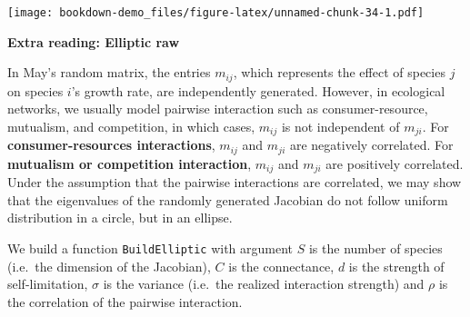 \documentclass[
]{book}
\begin{document}
\texttt{[image: bookdown-demo\_files/figure-latex/unnamed-chunk-34-1.pdf]}

\textbf{Extra reading: Elliptic raw}

In May's random matrix, the entries \(m_{ij}\), which represents the effect of species \(j\) on species \(i\)'s growth rate, are independently generated. However, in ecological networks, we usually model pairwise interaction such as consumer-resource, mutualism, and competition, in which cases, \(m_{ij}\) is not independent of \(m_{ji}\). For \textbf{consumer-resources interactions}, \(m_{ij}\) and \(m_{ji}\) are negatively correlated. For \textbf{mutualism or competition interaction}, \(m_{ij}\) and \(m_{ji}\) are positively correlated. Under the assumption that the pairwise interactions are correlated, we may show that the eigenvalues of the randomly generated Jacobian do not follow uniform distribution in a circle, but in an ellipse.

We build a function \texttt{BuildElliptic} with argument \(S\) is the number of species (i.e.~the dimension of the Jacobian), \(C\) is the connectance, \(d\) is the strength of self-limitation, \(\sigma\) is the variance (i.e.~the realized interaction strength) and \(\rho\) is the correlation of the pairwise interaction.
\end{document}
